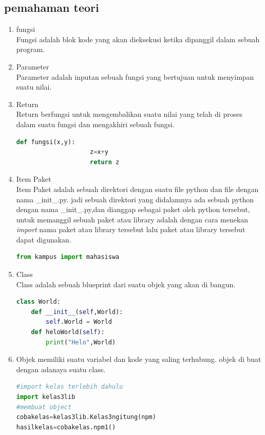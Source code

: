 \documentclass[a4paper, 12pt]{article}
\begin{document}
	\subsection{pemahaman teori}
		\begin{enumerate}
			\item fungsi\\
			Fungsi adalah blok kode yang akan dieksekusi ketika dipanggil dalam sebuah program.\\
			
			\item Parameter\\
			Parameter adalah inputan sebuah fungsi yang bertujuan untuk menyimpan suatu nilai.
			
			\item Return\\
			Return berfungsi untuk mengembalikan suatu nilai yang telah di proses dalam suatu fungsi dan mengakhiri sebuah fungsi.
			\begin{lstlisting}[language=Python]
			def fungsi(x,y):
					z=x+y
					return z
			\end{lstlisting}
			
			\item Item Paket\\
			Item Paket adalah sebuah direktori dengan suatu file python dan file dengan nama \_init\_.py. jadi sebuah direktori yang didalamnya ada sebuah python dengan nama \_init\_.py,dan dianggap sebagai paket oleh python tersebut, untuk memanggil sebuah paket atau library adalah dengan cara menekan \textit{import} nama paket atau library tersebut lalu paket atau library tersebut dapat digunakan.
			\begin{lstlisting}[language=Python]
			from kampus import mahasiswa
			\end{lstlisting}
			
			\item Class\\
			Class adalah sebuah blueprint dari suatu objek yang akan di bangun.
			\begin{lstlisting}[language=Python]
class World:
    def __init__(self,World):
        self.World = World
    def heloWorld(self):
        print("Helo",World)
			\end{lstlisting}
			
			\item Objek memiliki suatu variabel dan kode yang saling terhubung. objek di buat dengan adanaya suatu class.
			\begin{lstlisting}[language=Python]
#import kelas terlebih dahulu
import kelas3lib
#membuat object
cobakelas=kelas3lib.Kelas3ngitung(npm) 
hasilkelas=cobakelas.npm1()
			\end{lstlisting}
			

\end{enumerate}
\end{document}
